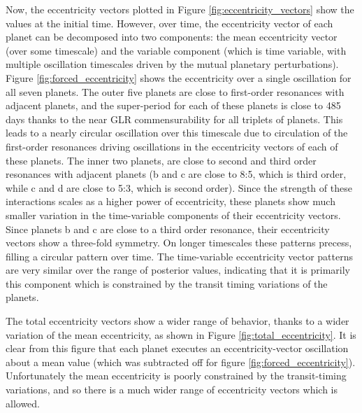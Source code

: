 \documentclass[twocolumn]{aastex63}
\begin{document}
Now, the eccentricity vectors plotted in Figure \ref{fig:eccentricity_vectors} show the
values at the initial time. However, over time, the eccentricity vector of each planet can be decomposed into two components: the mean eccentricity vector (over some timescale) and the variable component (which is time variable, with multiple oscillation timescales driven by the mutual planetary perturbations).   Figure \ref{fig:forced_eccentricity}
shows the eccentricity over a single oscillation for all seven planets.  The outer five
planets are close to first-order resonances with adjacent planets, and the super-period
for each of these planets is close to 485 days thanks to the near GLR commensurability
for all triplets of planets.  This leads to a nearly circular oscillation over this timescale
due to circulation of the first-order resonances driving oscillations in the eccentricity
vectors of each of these planets.  The inner two planets, are close to second and third
order resonances with adjacent planets (b and c are close to 8:5, which is third order,
while c and d are close to 5:3, which is second order).  Since the strength of these
interactions scales as a higher power of eccentricity, these planets show much smaller variation
in the time-variable components of their eccentricity vectors.  Since planets b and c are 
close to a third order resonance,
their eccentricity vectors show a three-fold symmetry.  On longer timescales these patterns
precess, filling a circular pattern over time.  The time-variable eccentricity vector patterns are
very similar over the range of posterior values, indicating that it is primarily this
component which is constrained by the transit timing variations of the planets.

The total eccentricity vectors show a wider range of behavior, thanks to a wider variation
of the mean eccentricity, as shown in Figure \ref{fig:total_eccentricity}.  It is clear
from this figure that each planet executes an eccentricity-vector oscillation about a
mean value (which was subtracted off for figure \ref{fig:forced_eccentricity}).  Unfortunately the mean eccentricity is poorly constrained by the transit-timing
variations, and so there is a much wider range of eccentricity vectors which is allowed.
\end{document}

